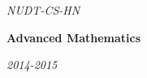 \begin{titlepage}

\begin{center}
	{\it\Large NUDT-CS-HN}

	\vspace{8cm}

	{\bf\Huge Advanced Mathematics}
	
	\vspace{15cm}
	
	{\it\large 2014-2015}
	
\end{center}

\end{titlepage}




\newpage